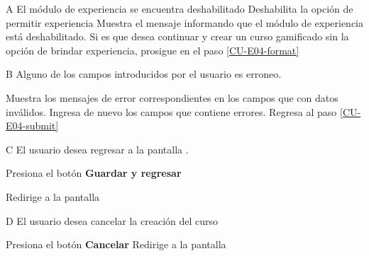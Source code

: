 \begin{UCtrayectoriaA}{A}{%
El módulo de experiencia se encuentra deshabilitado
}
  \Sistema Deshabilita la opción de permitir experiencia
  \Sistema Muestra el mensaje informando que el módulo de experiencia está 
           deshabilitado.
  \Actor Si es que desea continuar y crear un curso gamificado sin la opción
         de brindar experiencia, prosigue en el paso \ref{CU-E04-format}

\end{UCtrayectoriaA}

\begin{UCtrayectoriaA}{B}{%
Alguno de los campos introducidos por el usuario es erroneo.
}

  \Sistema Muestra los mensajes de error correspondientes en los campos que
           con datos inválidos.
  \Actor Ingresa de nuevo los campos que contiene errores.
  \Sistema Regresa al paso \ref{CU-E04-submit}

\end{UCtrayectoriaA}

\begin{UCtrayectoriaA}{C}{%
El usuario desea regresar a la pantalla .
}

  \Actor Presiona el botón {\bf Guardar y regresar}

  \Sistema Redirige a la pantalla 

\end{UCtrayectoriaA}

\begin{UCtrayectoriaA}{D}{%
El usuario desea cancelar la creación del curso
}

  \Actor Presiona el botón {\bf Cancelar}
  \Sistema Redirige a la pantalla 

\end{UCtrayectoriaA}
